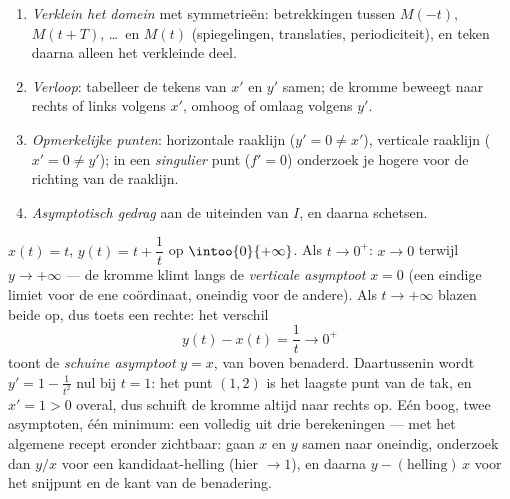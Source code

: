 \begin{method}\label{met:b1:curves:study}
\begin{enumerate}
  \item \emph{Verklein het domein} met symmetrieën: betrekkingen
        tussen $M(-t)$, $M(t + T)$, \dots\ en $M(t)$ (spiegelingen,
        translaties, periodiciteit), en teken daarna alleen het
        verkleinde deel.
  \item \emph{Verloop}: tabelleer de tekens van $x'$ en $y'$ samen;
        de kromme beweegt naar rechts of links volgens $x'$, omhoog
        of omlaag volgens $y'$.
  \item \emph{Opmerkelijke punten}: horizontale raaklijn ($y' = 0
        \neq x'$), verticale raaklijn ($x' = 0 \neq y'$); in een
        \emph{singulier} punt ($f' = 0$) onderzoek je hogere
         voor de richting van de raaklijn.
  \item \emph{Asymptotisch gedrag} aan de uiteinden van $I$, en
        daarna schetsen.
\end{enumerate}
\end{method}

\begin{example}
\label{ex:b1:curves:asymptotes}
$x(t) = t$, $y(t) = t + \dfrac1t$ op $\intoo{0}{+\infty}$. Als $t
\to 0^{+}$: $x \to 0$ terwijl $y \to +\infty$ --- de kromme klimt
langs de \emph{verticale asymptoot} $x = 0$ (een eindige limiet
voor de ene coördinaat, oneindig voor de andere). Als $t \to
+\infty$ blazen beide  op, dus toets een rechte: het
verschil
\[
y(t) - x(t) = \frac1t \longrightarrow 0^{+}
\]
toont de \emph{schuine asymptoot} $y = x$, van boven benaderd.
Daartussenin wordt $y' = 1 - \frac1{t^2}$ nul bij $t = 1$: het
punt $(1, 2)$ is het laagste punt van de tak, en $x' = 1 > 0$
overal, dus schuift de kromme altijd naar rechts op. Eén boog,
twee asymptoten, één minimum: een volledig  uit drie
berekeningen --- met het algemene recept eronder zichtbaar: gaan
$x$ en $y$ samen naar oneindig, onderzoek dan $y/x$ voor een
kandidaat-helling (hier $\to 1$), en daarna $y -
(\text{helling})\,x$ voor het snijpunt en de kant van de
benadering.
\end{example}

